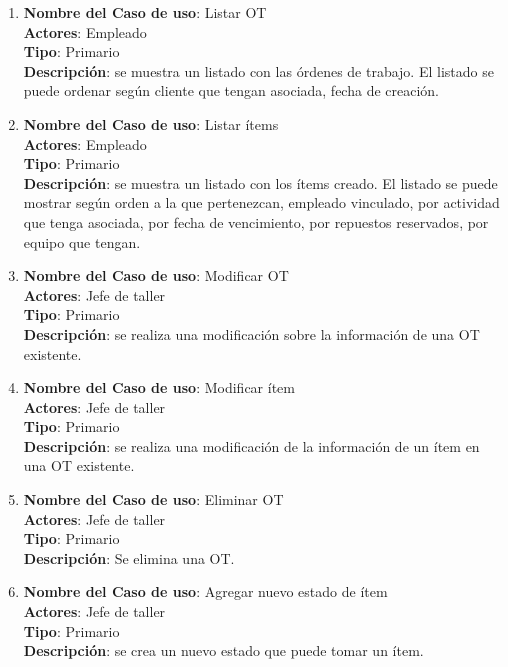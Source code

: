 \documentclass[12pt]{extarticle}
\begin{document}
\begin{spacing}{1.2}
\begin{enumerate}
            \item 	\textbf{Nombre del Caso de uso}: Listar OT\\
                    \textbf{Actores}: Empleado\\
                    \textbf{Tipo}: Primario\\
                    \textbf{Descripción}: se muestra un listado con las órdenes de trabajo. El listado se puede ordenar según cliente que tengan asociada, fecha de creación.

            \item 	\textbf{Nombre del Caso de uso}: Listar ítems\\
                    \textbf{Actores}: Empleado\\
                    \textbf{Tipo}: Primario\\
                    \textbf{Descripción}: se muestra un listado con los ítems creado. El listado se puede mostrar según orden a la que pertenezcan, empleado vinculado, por actividad que tenga asociada, por fecha de vencimiento, por repuestos reservados, por equipo que tengan.

            \item 	\textbf{Nombre del Caso de uso}: Modificar OT\\
                    \textbf{Actores}: Jefe de taller\\
                    \textbf{Tipo}: Primario\\
                    \textbf{Descripción}: se realiza una modificación sobre la información de una OT existente.

            \item 	\textbf{Nombre del Caso de uso}: Modificar ítem\\
                    \textbf{Actores}: Jefe de taller\\
                    \textbf{Tipo}: Primario\\
                    \textbf{Descripción}: se realiza una modificación de la información de un ítem en una OT existente. 

            \item 	\textbf{Nombre del Caso de uso}: Eliminar OT\\
                    \textbf{Actores}: Jefe de taller\\
                    \textbf{Tipo}: Primario\\
                    \textbf{Descripción}: Se elimina una OT.

            \item 	\textbf{Nombre del Caso de uso}: Agregar nuevo estado de ítem\\
                    \textbf{Actores}: Jefe de taller\\
                    \textbf{Tipo}: Primario\\
                    \textbf{Descripción}: se crea un nuevo estado que puede tomar un ítem.


\end{enumerate}
\end{spacing}
\end{document}
